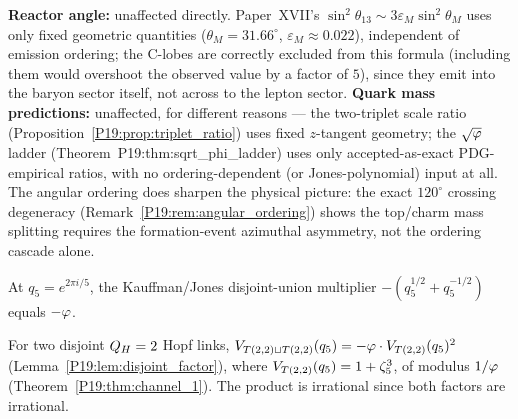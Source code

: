 \begin{remark}
\label{P19:rem:angular_ordering_impact}
\textbf{Reactor angle:} unaffected directly. Paper~XVII's
$\sin^2\theta_{13}\sim3\varepsilon_M\sin^2\theta_M$ uses only fixed
geometric quantities ($\theta_M=31.66^\circ$, $\varepsilon_M\approx0.022$),
independent of emission ordering; the C-lobes are correctly excluded
from this formula (including them would overshoot the observed value
by a factor of $5$), since they emit into the baryon sector itself,
not across to the lepton sector. \textbf{Quark mass predictions:}
unaffected, for different reasons --- the two-triplet scale ratio
(Proposition~\ref{P19:prop:triplet_ratio}) uses fixed $z$-tangent
geometry; the $\sqrt{\varphi}$ ladder (Theorem~P19:thm:sqrt\_phi\_ladder)
uses only accepted-as-exact PDG-empirical ratios, with no
ordering-dependent (or Jones-polynomial) input at all. The angular
ordering does sharpen the physical picture: the exact $120^\circ$
crossing degeneracy (Remark~\ref{P19:rem:angular_ordering}) shows the
top/charm mass splitting requires the formation-event azimuthal
asymmetry, not the ordering cascade alone.
\end{remark}


\begin{lemma}
\label{P19:lem:disjoint_factor}
At $q_5=e^{2\pi i/5}$, the Kauffman/Jones disjoint-union multiplier
$-(q_5^{1/2}+q_5^{-1/2})$ equals $-\varphi$.
\end{lemma}

\begin{proposition}
\label{P19:prop:two_comp_initial}
For two disjoint $Q_H=2$ Hopf links, $V_{T(2,2)\sqcup T(2,2)}(q_5)
=-\varphi\cdot V_{T(2,2)}(q_5)^2$
(Lemma~\ref{P19:lem:disjoint_factor}), where
$V_{T(2,2)}(q_5)=1+\zeta_5^3$, of modulus $1/\varphi$
(Theorem~\ref{P19:thm:channel_1}). The product is irrational since
both factors are irrational.
\end{proposition}

